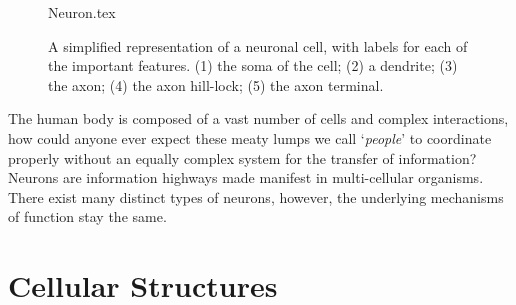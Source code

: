 \documentclass[../../Orator]{subfiles}
\begin{document}
\begin{figure}[h]

    \centering
    {Neuron.tex}
    \caption{A simplified representation of a neuronal cell, with labels for each of the important features. (1) the soma of the cell; (2) a dendrite; (3) the axon; (4) the axon hill-lock; (5) the axon terminal.}\label{fig:Neuron}

\end{figure}

The human body is composed of a vast number of cells and complex interactions, how could anyone ever expect these meaty lumps we call `\textit{people}' to coordinate properly without an equally complex system for the transfer of information? 
Neurons are information highways made manifest in multi-cellular organisms. 
There exist many distinct types of neurons, however, the underlying mechanisms of function stay the same.


\section{Cellular Structures}

\begin{comment}
    \subsection{Organelles}
    {\noindent
    Nucleus \\
    Ribosomes \\
    Golgi-Apparatus \\
    Endoplasmic Reticulum, rough \& smooth \\
    Lysosome
    }
\end{comment}
\end{document}
